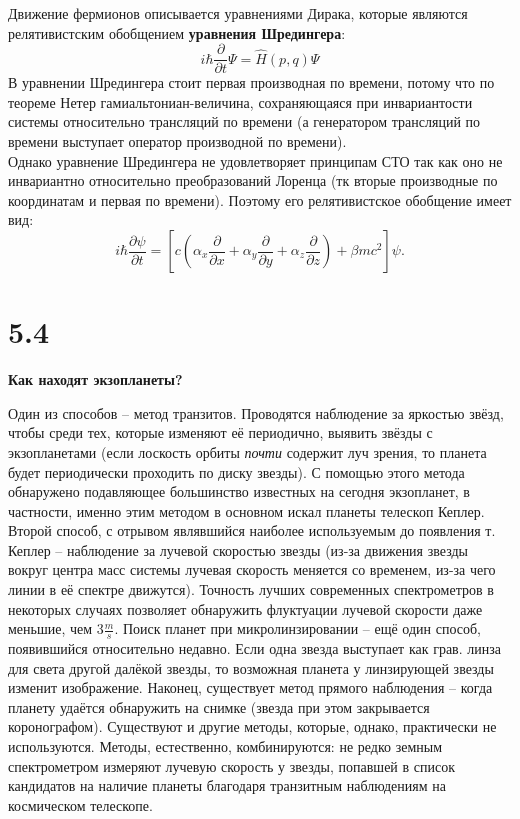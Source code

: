 \documentclass[a4paper,14pt]{article}
\begin{document}
Движение фермионов описывается уравнениями Дирака, которые являются релятивистским обобщением \textbf{уравнения Шредингера}:
\begin{equation}
	i \hbar \frac{\partial}{\partial t} \Psi=\hat{H}(p, q) \Psi
\end{equation}
В уравнении Шредингера стоит первая производная по времени, потому что по теореме Нетер гамиальтониан-величина, сохраняющаяся при инвариантости системы относительно трансляций по времени (а генератором трансляций по времени выступает оператор производной по времени).\\
Однако уравнение Шредингера не удовлетворяет принципам СТО так как оно не инвариантно относительно преобразований Лоренца (тк вторые производные по координатам и первая по времени). Поэтому его релятивистское обобщение имеет вид:
\begin{equation}
	i \hbar \frac{\partial \psi}{\partial t}=\left[c\left(\alpha_{x} \frac{\partial}{\partial x}+\alpha_{y} \frac{\partial}{\partial y}+\alpha_{z} \frac{\partial}{\partial z}\right)+\beta m c^{2}\right] \psi.
\end{equation}


\section*{5.4}

\begin{center}
	\LARGE{\textbf{Как находят экзопланеты?}}\\
\end{center}

Один из способов -- метод транзитов. Проводятся наблюдение за яркостью звёзд, чтобы среди тех, которые изменяют её периодично, выявить звёзды с экзопланетами (если лоскость орбиты \textit{почти} содержит луч зрения, то планета будет периодически проходить по диску звезды). С помощью этого метода обнаружено подавляющее большинство известных на сегодня экзопланет, в частности, именно этим методом в основном искал планеты телескоп Кеплер. Второй способ, с отрывом являвшийся наиболее используемым до появления т. Кеплер -- наблюдение за лучевой скоростью звезды (из-за движения звезды вокруг центра масс системы лучевая скорость меняется со временем, из-за чего линии в её спектре движутся). Точность лучших современных спектрометров в некоторых случаях позволяет обнаружить флуктуации лучевой скорости даже меньшие, чем 3$\frac{m}{s}$. Поиск планет при микролинзировании -- ещё один способ, появившийся относительно недавно. Если одна звезда выступает как грав. линза для света другой далёкой звезды, то возможная планета у линзирующей звезды изменит изображение. Наконец, существует метод прямого наблюдения -- когда планету удаётся обнаружить на снимке (звезда при этом закрывается коронографом). Существуют и другие методы, которые, однако, практически не используются. Методы, естественно, комбинируются: не редко земным спектрометром измеряют лучевую скорость у звезды, попавшей в список кандидатов на наличие планеты благодаря транзитным наблюдениям на космическом телескопе.
\end{document}
